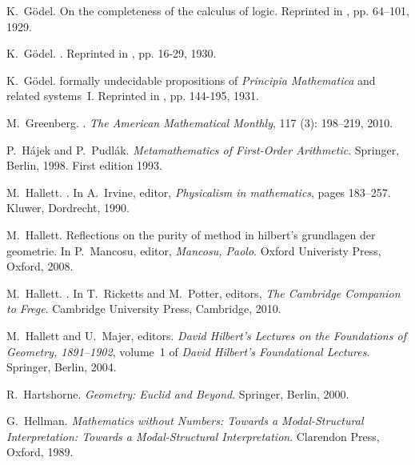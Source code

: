 \documentclass[11pt,fleqn,leqno]{article}
\begin{document}
\begin{thebibliography}{118}
K.~G{\"o}del.
\newblock On the completeness of the calculus of logic.
\newblock Reprinted in \citep{Godel1986}, pp. 64--101, 1929.

K.~G{\"o}del.
.
\newblock Reprinted in \citep{Godel1995}, pp. 16-29, 1930.

K.~G\"odel.
 formally undecidable propositions of {{\em {Principia
  Mathematica}\/}} and related systems~{I}.
\newblock Reprinted in \cite{Godel1986}, pp. 144-195, 1931.

M.~Greenberg.
.
\newblock \emph{The American Mathematical Monthly}, 117 (3):
  198--219, 2010.

P.~H{\'a}jek and P.~Pudl{\'a}k.
\newblock \emph{Metamathematics of First-Order Arithmetic}.
\newblock Springer, Berlin, 1998.
\newblock First edition 1993.

M.~Hallett.
.
\newblock In A.~Irvine, editor, \emph{Physicalism in mathematics}, pages
  183--257. Kluwer, Dordrecht, 1990.

M.~Hallett.
\newblock Reflections on the purity of method in hilbert's grundlagen der
  geometrie.
\newblock In P.~Mancosu, editor, \emph{Mancosu, Paolo}. Oxford Univeristy
  Press, Oxford, 2008.

M.~Hallett.
.
\newblock In T.~Ricketts and M.~Potter, editors, \emph{{The Cambridge Companion
  to Frege}}. {C}ambridge {U}niversity {P}ress, Cambridge, 2010.

M.~Hallett and U.~Majer, editors.
\newblock \emph{David {H}ilbert's {L}ectures on the {F}oundations of
  {G}eometry, 1891--1902}, volume~1 of \emph{David Hilbert's Foundational
  Lectures}.
\newblock Springer, Berlin, 2004.

R.~Hartshorne.
\newblock \emph{Geometry: {E}uclid and {B}eyond}.
\newblock Springer, Berlin, 2000.

G.~Hellman.
\newblock \emph{Mathematics without Numbers: Towards a Modal-Structural
  Interpretation: Towards a Modal-Structural Interpretation}.
\newblock Clarendon Press, Oxford, 1989.


\end{thebibliography}
\end{document}
